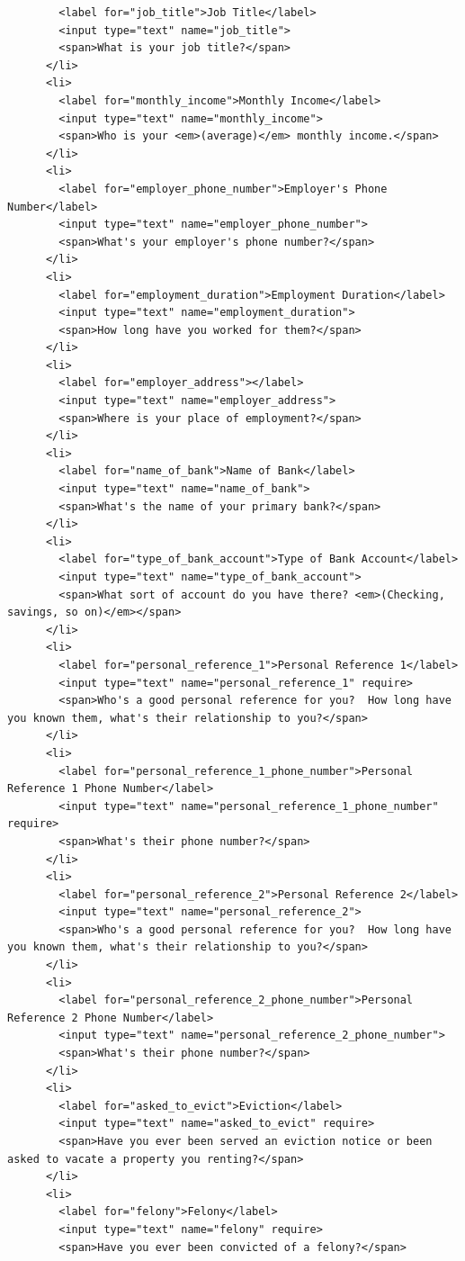 \documentclass[11pt]{article}
\begin{document}
\begin{enumerate}
\begin{verbatim}
	    <label for="job_title">Job Title</label>
	    <input type="text" name="job_title">
	    <span>What is your job title?</span>
	  </li>
	  <li>
	    <label for="monthly_income">Monthly Income</label>
	    <input type="text" name="monthly_income">
	    <span>Who is your <em>(average)</em> monthly income.</span>
	  </li>
	  <li>
	    <label for="employer_phone_number">Employer's Phone Number</label>
	    <input type="text" name="employer_phone_number">
	    <span>What's your employer's phone number?</span>
	  </li>
	  <li>
	    <label for="employment_duration">Employment Duration</label>
	    <input type="text" name="employment_duration">
	    <span>How long have you worked for them?</span>
	  </li>
	  <li>
	    <label for="employer_address"></label>
	    <input type="text" name="employer_address">
	    <span>Where is your place of employment?</span>
	  </li>
	  <li>
	    <label for="name_of_bank">Name of Bank</label>
	    <input type="text" name="name_of_bank">
	    <span>What's the name of your primary bank?</span>
	  </li>
	  <li>
	    <label for="type_of_bank_account">Type of Bank Account</label>
	    <input type="text" name="type_of_bank_account">
	    <span>What sort of account do you have there? <em>(Checking, savings, so on)</em></span>
	  </li>
	  <li>
	    <label for="personal_reference_1">Personal Reference 1</label>
	    <input type="text" name="personal_reference_1" require>
	    <span>Who's a good personal reference for you?  How long have you known them, what's their relationship to you?</span>
	  </li>
	  <li>
	    <label for="personal_reference_1_phone_number">Personal Reference 1 Phone Number</label>
	    <input type="text" name="personal_reference_1_phone_number" require>
	    <span>What's their phone number?</span>
	  </li>
	  <li>
	    <label for="personal_reference_2">Personal Reference 2</label>
	    <input type="text" name="personal_reference_2">
	    <span>Who's a good personal reference for you?  How long have you known them, what's their relationship to you?</span>
	  </li>
	  <li>
	    <label for="personal_reference_2_phone_number">Personal Reference 2 Phone Number</label>
	    <input type="text" name="personal_reference_2_phone_number">
	    <span>What's their phone number?</span>
	  </li>
	  <li>
	    <label for="asked_to_evict">Eviction</label>
	    <input type="text" name="asked_to_evict" require>
	    <span>Have you ever been served an eviction notice or been asked to vacate a property you renting?</span>
	  </li>
	  <li>
	    <label for="felony">Felony</label>
	    <input type="text" name="felony" require>
	    <span>Have you ever been convicted of a felony?</span>

\end{verbatim}
\end{enumerate}
\end{document}
